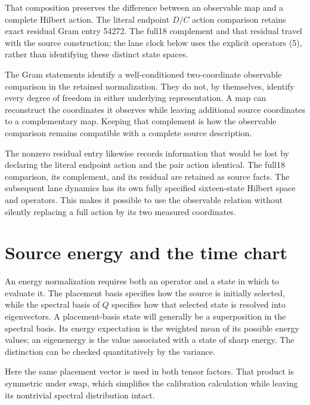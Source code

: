 \documentclass[10pt,twocolumn,letterpaper]{article}
\begin{document}
That composition preserves the difference between an observable map and a complete Hilbert action. The literal endpoint $D/C$ action comparison retains exact residual Gram entry 54272. The full18 complement and that residual travel with the source construction; the lane clock below uses the explicit operators (5), rather than identifying these distinct state spaces.

The Gram statements identify a well-conditioned two-coordinate observable comparison in the retained normalization. They do not, by themselves, identify every degree of freedom in either underlying representation. A map can reconstruct the coordinates it observes while leaving additional source coordinates to a complementary map. Keeping that complement is how the observable comparison remains compatible with a complete source description.

The nonzero residual entry likewise records information that would be lost by declaring the literal endpoint action and the pair action identical. The full18 comparison, its complement, and its residual are retained as source facts. The subsequent lane dynamics has its own fully specified sixteen-state Hilbert space and operators. This makes it possible to use the observable relation without silently replacing a full action by its two measured coordinates.



\section{Source energy and the time chart}

An energy normalization requires both an operator and a state in which to evaluate it. The placement basis specifies how the source is initially selected, while the spectral basis of $Q$ specifies how that selected state is resolved into eigenvectors. A placement-basis state will generally be a superposition in the spectral basis. Its energy expectation is the weighted mean of its possible energy values; an eigenenergy is the value associated with a state of sharp energy. The distinction can be checked quantitatively by the variance.

Here the same placement vector is used in both tensor factors. That product is symmetric under swap, which simplifies the calibration calculation while leaving its nontrivial spectral distribution intact.
\end{document}
